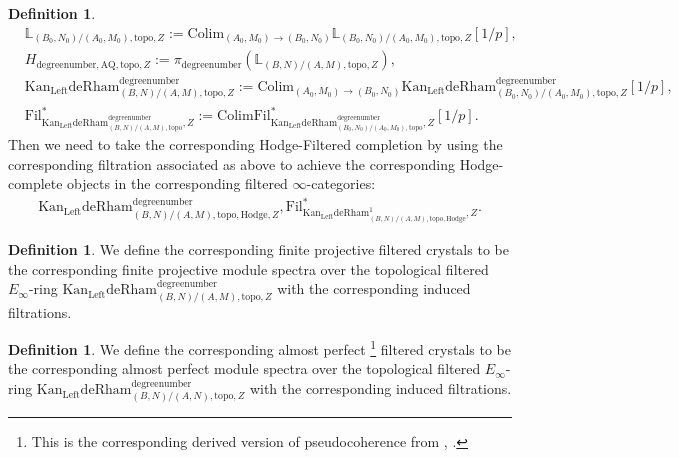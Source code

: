 \documentclass[11pt]{book}
\theoremstyle{definition}
\newtheorem{definition}[theorem]{Definition}
\numberwithin{equation}{section}
\begin{document}
\begin{definition}
\begin{align}
&\mathbb{L}_{(B_0,N_0)/(A_0,M_0),\mathrm{topo},Z}:= \mathrm{Colim}_{(A_0,M_0)\rightarrow (B_0,N_0)}\mathbb{L}_{(B_0,N_0)/(A_0,M_0),\mathrm{topo},Z}[1/p],\\
&H_{\text{degreenumber},{\mathrm{AQ}},\mathrm{topo},Z}:=\pi_\text{degreenumber} (\mathbb{L}_{(B,N)/(A,M),\mathrm{topo},Z}),	\\
&\mathrm{Kan}_\mathrm{Left}\mathrm{deRham}^\text{degreenumber}_{(B,N)/(A,M),\mathrm{topo},Z}:=\mathrm{Colim}_{(A_0,M_0)\rightarrow (B_0,N_0)}\mathrm{Kan}_\mathrm{Left}\mathrm{deRham}^\text{degreenumber}_{(B_0,N_0)/(A_0,M_0),\mathrm{topo},Z}[1/p],\\
&\mathrm{Fil}^*_{\mathrm{Kan}_\mathrm{Left}\mathrm{deRham}^\text{degreenumber}_{(B,N)/(A,M),\mathrm{topo}},Z}:=\mathrm{Colim}\mathrm{Fil}^*_{\mathrm{Kan}_\mathrm{Left}\mathrm{deRham}^\text{degreenumber}_{(B_0,N_0)/(A_0,M_0),\mathrm{topo}},Z}[1/p].
\end{align}
Then we need to take the corresponding Hodge-Filtered completion by using the corresponding filtration associated as above to achieve the corresponding Hodge-complete objects in the corresponding filtered $\infty$-categories:
\begin{align}
{\mathrm{Kan}_\mathrm{Left}\mathrm{deRham}}^\text{degreenumber}_{(B,N)/(A,M),\mathrm{topo,Hodge},Z},\mathrm{Fil}^*_{{\mathrm{Kan}_\mathrm{Left}\mathrm{deRham}}^1_{(B,N)/(A,M),\mathrm{topo,Hodge}},Z}.	
\end{align} 	
\end{definition}


\begin{definition}
We define the corresponding finite projective filtered crystals to be the corresponding finite projective module spectra over the topological filtered $E_\infty$-ring $\mathrm{Kan}_\mathrm{Left}\mathrm{deRham}^\text{degreenumber}_{(B,N)/(A,M),\mathrm{topo},Z}$ with the corresponding induced filtrations.	
\end{definition}


\begin{definition}
We define the corresponding almost perfect \footnote{This is the corresponding derived version of pseudocoherence from \cite{12Lu1}, \cite{12Lu2}.} filtered crystals to be the corresponding almost perfect module spectra over the topological filtered $E_\infty$-ring $\mathrm{Kan}_\mathrm{Left}\mathrm{deRham}^\text{degreenumber}_{(B,N)/(A,N),\mathrm{topo},Z}$ with the corresponding induced filtrations.	
\end{definition}
\end{document}
